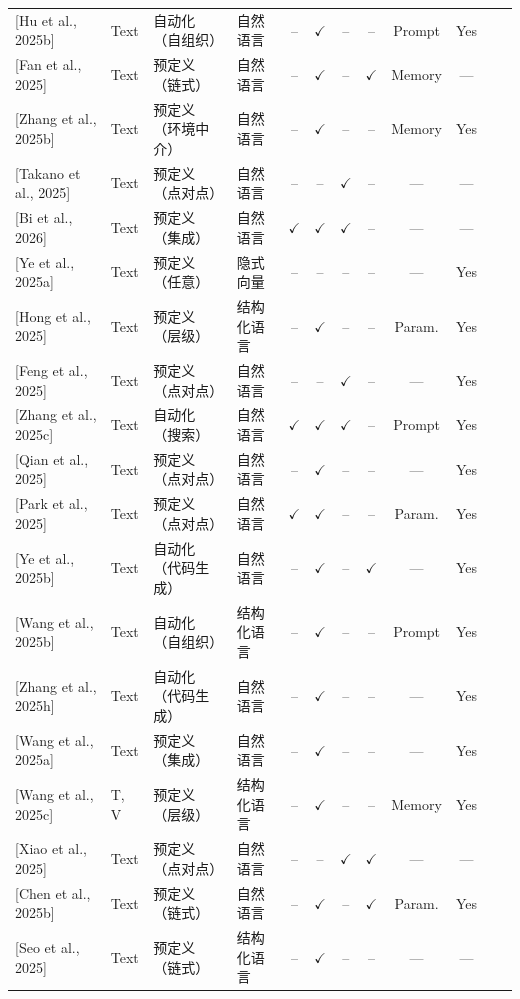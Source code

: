 \documentclass[UTF8,a4paper,12pt]{article}
\def\yes{$\checkmark$}
\def\no{--}
\begin{document}
\begin{table}[htbp]
\begin{tabular}{p{2.4cm}p{1.5cm}p{2.2cm}p{1.8cm}ccccccp{1.2cm}c}
{[}Hu et al., 2025b{]} & Text & 自动化（自组织） & 自然语言 & \no & \yes & \no & \no & Prompt & Yes \\
{[}Fan et al., 2025{]} & Text & 预定义（链式） & 自然语言 & \no & \yes & \no & \yes & Memory & --- \\
{[}Zhang et al., 2025b{]} & Text & 预定义（环境中介） & 自然语言 & \no & \yes & \no & \no & Memory & Yes \\
{[}Takano et al., 2025{]} & Text & 预定义（点对点） & 自然语言 & \no & \no & \yes & \no & --- & --- \\
{[}Bi et al., 2026{]} & Text & 预定义（集成） & 自然语言 & \yes & \yes & \yes & \no & --- & --- \\
{[}Ye et al., 2025a{]} & Text & 预定义（任意） & 隐式向量 & \no & \no & \no & \no & --- & Yes \\
{[}Hong et al., 2025{]} & Text & 预定义（层级） & 结构化语言 & \no & \yes & \no & \no & Param. & Yes \\
{[}Feng et al., 2025{]} & Text & 预定义（点对点） & 自然语言 & \no & \no & \yes & \no & --- & Yes \\
{[}Zhang et al., 2025c{]} & Text & 自动化（搜索） & 自然语言 & \yes & \yes & \yes & \no & Prompt & Yes \\
{[}Qian et al., 2025{]} & Text & 预定义（点对点） & 自然语言 & \no & \yes & \no & \no & --- & Yes \\
{[}Park et al., 2025{]} & Text & 预定义（点对点） & 自然语言 & \yes & \yes & \no & \no & Param. & Yes \\
{[}Ye et al., 2025b{]} & Text & 自动化（代码生成） & 自然语言 & \no & \yes & \no & \yes & --- & Yes \\
{[}Wang et al., 2025b{]} & Text & 自动化（自组织） & 结构化语言 & \no & \yes & \no & \no & Prompt & Yes \\
{[}Zhang et al., 2025h{]} & Text & 自动化（代码生成） & 自然语言 & \no & \yes & \no & \no & --- & Yes \\
{[}Wang et al., 2025a{]} & Text & 预定义（集成） & 自然语言 & \no & \yes & \no & \no & --- & Yes \\
{[}Wang et al., 2025c{]} & T, V & 预定义（层级） & 结构化语言 & \no & \yes & \no & \no & Memory & Yes \\
{[}Xiao et al., 2025{]} & Text & 预定义（点对点） & 自然语言 & \no & \no & \yes & \yes & --- & --- \\
{[}Chen et al., 2025b{]} & Text & 预定义（链式） & 自然语言 & \no & \yes & \no & \yes & Param. & Yes \\
{[}Seo et al., 2025{]} & Text & 预定义（链式） & 结构化语言 & \no & \yes & \no & \no & --- & --- \\

\end{tabular}
\end{table}
\end{document}
